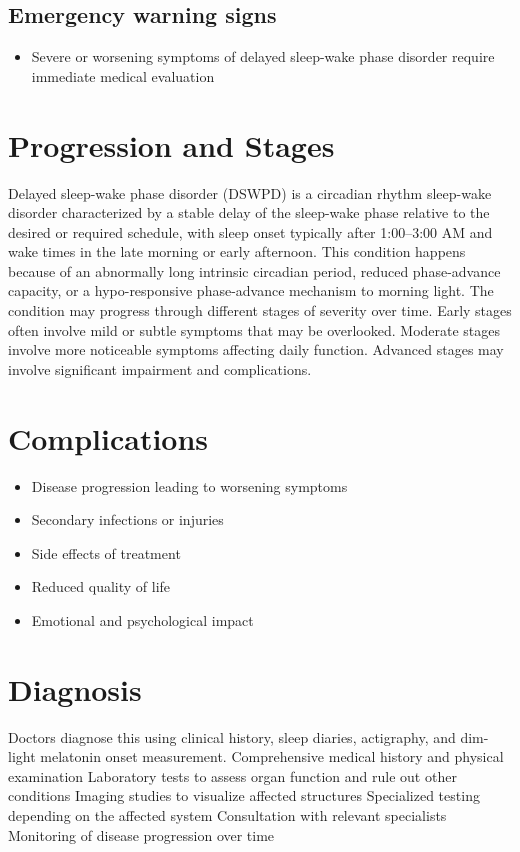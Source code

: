 \subsection{Emergency warning signs}
\begin{itemize}[noitemsep]
  \item Severe or worsening symptoms of delayed sleep-wake phase disorder require immediate medical evaluation
\end{itemize}
\section{Progression and Stages}
Delayed sleep-wake phase disorder (DSWPD) is a circadian rhythm sleep-wake disorder characterized by a stable delay of the sleep-wake phase relative to the desired or required schedule, with sleep onset typically after 1:00--3:00 AM and wake times in the late morning or early afternoon. This condition happens because of an abnormally long intrinsic circadian period, reduced phase-advance capacity, or a hypo-responsive phase-advance mechanism to morning light. The condition may progress through different stages of severity over time. Early stages often involve mild or subtle symptoms that may be overlooked. Moderate stages involve more noticeable symptoms affecting daily function. Advanced stages may involve significant impairment and complications.
\section{Complications}
\begin{itemize}[noitemsep]
  \item Disease progression leading to worsening symptoms
  \item Secondary infections or injuries
  \item Side effects of treatment
  \item Reduced quality of life
  \item Emotional and psychological impact
\end{itemize}
\section{Diagnosis}
Doctors diagnose this using clinical history, sleep diaries, actigraphy, and dim-light melatonin onset measurement. Comprehensive medical history and physical examination Laboratory tests to assess organ function and rule out other conditions Imaging studies to visualize affected structures Specialized testing depending on the affected system Consultation with relevant specialists Monitoring of disease progression over time


